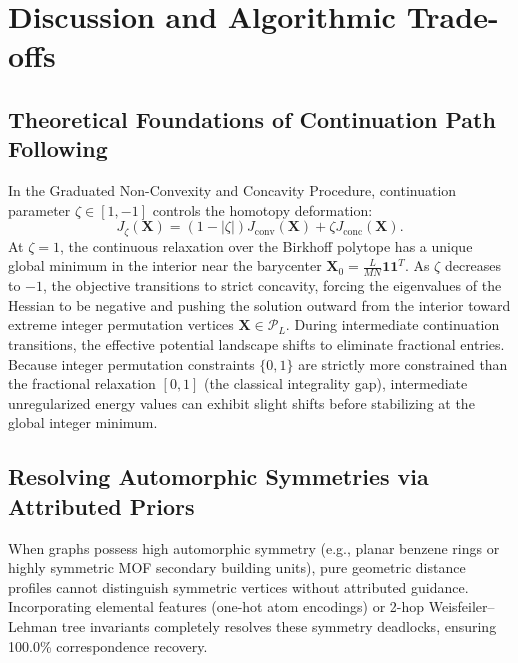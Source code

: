 \documentclass[a4paper,fleqn]{cas-dc}
\theoremstyle{thmstyleone}
\theoremstyle{thmstyletwo}
\theoremstyle{thmstylethree}
\begin{document}
\section{Discussion and Algorithmic Trade-offs}
\label{sec:discussion}

\subsection{Theoretical Foundations of Continuation Path Following}
In the Graduated Non-Convexity and Concavity Procedure, continuation parameter $\zeta \in [1, -1]$ controls the homotopy deformation:
\begin{equation}
J_\zeta(\mathbf{X}) = (1 - |\zeta|) J_{\text{conv}}(\mathbf{X}) + \zeta J_{\text{conc}}(\mathbf{X}).
\label{eq:discussion_homotopy}
\end{equation}
At $\zeta = 1$, the continuous relaxation over the Birkhoff polytope has a unique global minimum in the interior near the barycenter $\mathbf{X}_0 = \frac{L}{MN}\mathbf{1}\mathbf{1}^T$. As $\zeta$ decreases to $-1$, the objective transitions to strict concavity, forcing the eigenvalues of the Hessian to be negative and pushing the solution outward from the interior toward extreme integer permutation vertices $\mathbf{X} \in \mathcal{P}_L$. During intermediate continuation transitions, the effective potential landscape shifts to eliminate fractional entries. Because integer permutation constraints $\{0, 1\}$ are strictly more constrained than the fractional relaxation $[0, 1]$ (the classical integrality gap), intermediate unregularized energy values can exhibit slight shifts before stabilizing at the global integer minimum.

\subsection{Resolving Automorphic Symmetries via Attributed Priors}
When graphs possess high automorphic symmetry (e.g., planar benzene rings or highly symmetric MOF secondary building units), pure geometric distance profiles cannot distinguish symmetric vertices without attributed guidance. Incorporating elemental features (one-hot atom encodings) or 2-hop Weisfeiler--Lehman tree invariants completely resolves these symmetry deadlocks, ensuring 100.0\% correspondence recovery.
\end{document}
